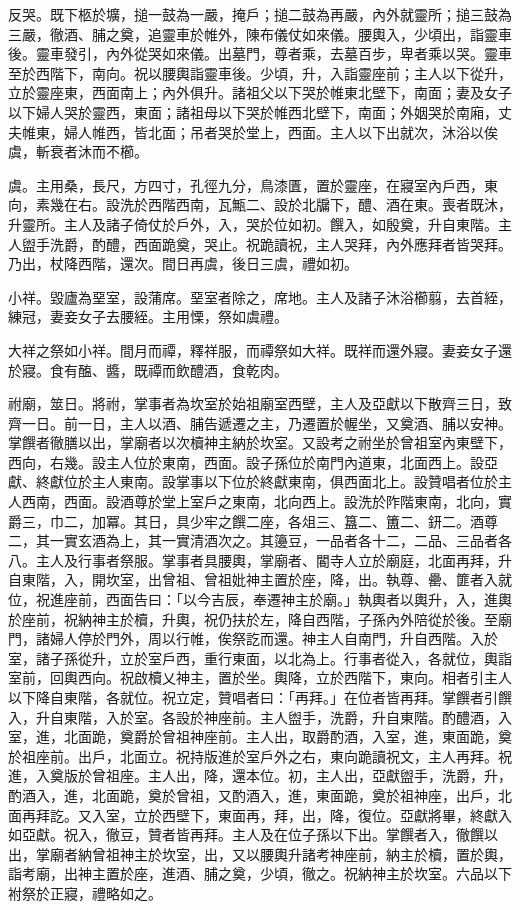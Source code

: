 \begin{pinyinscope}
 反哭。既下柩於壙，搥一鼓為一嚴，掩戶；搥二鼓為再嚴，內外就靈所；搥三鼓為三嚴，徹酒、脯之奠，追靈車於帷外，陳布儀仗如來儀。腰輿入，少頃出，詣靈車後。靈車發引，內外從哭如來儀。出墓門，尊者乘，去墓百步，卑者乘以哭。靈車至於西階下，南向。祝以腰輿詣靈車後。少頃，升，入詣靈座前；主人以下從升，立於靈座東，西面南上；內外俱升。諸祖父以下哭於帷東北壁下，南面；妻及女子以下婦人哭於靈西，東面；諸祖母以下哭於帷西北壁下，南面；外姻哭於南廂，丈夫帷東，婦人帷西，皆北面；吊者哭於堂上，西面。主人以下出就次，沐浴以俟虞，斬衰者沐而不櫛。



 虞。主用桑，長尺，方四寸，孔徑九分，鳥漆匱，置於靈座，在寢室內戶西，東向，素幾在右。設洗於西階西南，瓦甒二、設於北牖下，醴、酒在東。喪者既沐，升靈所。主人及諸子倚仗於戶外，入，哭於位如初。饌入，如殷奠，升自東階。主人盥手洗爵，酌醴，西面跪奠，哭止。祝跪讀祝，主人哭拜，內外應拜者皆哭拜。乃出，杖降西階，還次。間日再虞，後日三虞，禮如初。



 小祥。毀廬為堊室，設蒲席。堊室者除之，席地。主人及諸子沐浴櫛翦，去首絰，練冠，妻妾女子去腰絰。主用慄，祭如虞禮。



 大祥之祭如小祥。間月而禫，釋祥服，而禫祭如大祥。既祥而還外寢。妻妾女子還於寢。食有醢、醬，既禫而飲醴酒，食乾肉。



 祔廟，筮日。將祔，掌事者為坎室於始祖廟室西壁，主人及亞獻以下散齊三日，致齊一日。前一日，主人以酒、脯告遞遷之主，乃遷置於幄坐，又奠酒、脯以安神。掌饌者徹膳以出，掌廟者以次櫝神主納於坎室。又設考之祔坐於曾祖室內東壁下，西向，右幾。設主人位於東南，西面。設子孫位於南門內道東，北面西上。設亞獻、終獻位於主人東南。設掌事以下位於終獻東南，俱西面北上。設贊唱者位於主人西南，西面。設酒尊於堂上室戶之東南，北向西上。設洗於阼階東南，北向，實爵三，巾二，加冪。其日，具少牢之饌二座，各俎三、簋二、簠二、鈃二。酒尊二，其一實玄酒為上，其一實清酒次之。其籩豆，一品者各十二，二品、三品者各八。主人及行事者祭服。掌事者具腰輿，掌廟者、閽寺人立於廟庭，北面再拜，升自東階，入，開坎室，出曾祖、曾祖妣神主置於座，降，出。執尊、罍、篚者入就位，祝進座前，西面告曰：「以今吉辰，奉遷神主於廟。」執輿者以輿升，入，進輿於座前，祝納神主於櫝，升輿，祝仍扶於左，降自西階，子孫內外陪從於後。至廟門，諸婦人停於門外，周以行帷，俟祭訖而還。神主人自南門，升自西階。入於室，諸子孫從升，立於室戶西，重行東面，以北為上。行事者從入，各就位，輿詣室前，回輿西向。祝啟櫝乂神主，置於坐。輿降，立於西階下，東向。相者引主人以下降自東階，各就位。祝立定，贊唱者曰：「再拜。」在位者皆再拜。掌饌者引饌入，升自東階，入於室。各設於神座前。主人盥手，洗爵，升自東階。酌醴酒，入室，進，北面跪，奠爵於曾祖神座前。主人出，取爵酌酒，入室，進，東面跪，奠於祖座前。出戶，北面立。祝持版進於室戶外之右，東向跪讀祝文，主人再拜。祝進，入奠版於曾祖座。主人出，降，還本位。初，主人出，亞獻盥手，洗爵，升，酌酒入，進，北面跪，奠於曾祖，又酌酒入，進，東面跪，奠於祖神座，出戶，北面再拜訖。又入室，立於西壁下，東面再，拜，出，降，復位。亞獻將畢，終獻入如亞獻。祝入，徹豆，贊者皆再拜。主人及在位子孫以下出。掌饌者入，徹饌以出，掌廟者納曾祖神主於坎室，出，又以腰輿升諸考神座前，納主於櫝，置於輿，詣考廟，出神主置於座，進酒、脯之奠，少頃，徹之。祝納神主於坎室。六品以下袝祭於正寢，禮略如之。



\end{pinyinscope}